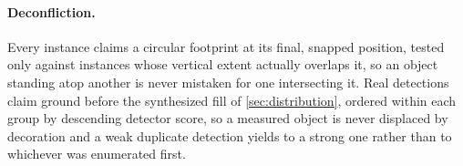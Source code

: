 \paragraph{Deconfliction.} Every instance claims a circular footprint at its final,
snapped position, tested only against instances whose vertical extent actually
overlaps it, so an object standing atop another is never mistaken for one
intersecting it. Real detections claim ground before the synthesized fill of
\cref{sec:distribution}, ordered within each group by descending detector score, so
a measured object is never displaced by decoration and a weak duplicate detection
yields to a strong one rather than to whichever was enumerated first.
